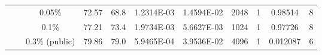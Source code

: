 \begin{table}[htbp]
\begin{tabular}{ccccc|cccccc}
          &       & 0.05\% & \cellcolor[rgb]{ .388,  .745,  .482}72.57 & \cellcolor[rgb]{ .973,  .412,  .42}68.8 & 1.2314E-03 & 1.4594E-02 & 2048  & 1     & 0.98514 & 8 \\
          &       & 0.1\% & \cellcolor[rgb]{ .388,  .745,  .482}77.21 & \cellcolor[rgb]{ .973,  .412,  .42}73.4 & 1.9734E-03 & 5.6627E-03 & 1024  & 1     & 0.97726 & 8 \\
          &       & 0.3\% (public) & \cellcolor[rgb]{ .388,  .745,  .482}79.86 & \cellcolor[rgb]{ .973,  .412,  .42}79.0 & 5.9465E-04 & 3.9536E-02 & 4096  & 1     & 0.012087 & 6 \\
    \bottomrule
    \bottomrule
    \end{tabular}%
  \label{tab:hyperparameters_with_validation}%
\end{table}%
